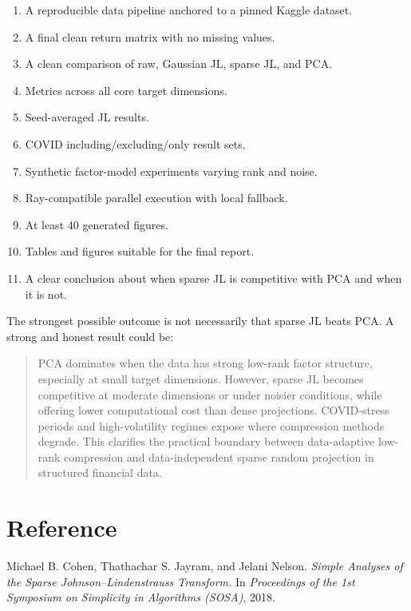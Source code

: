 \documentclass[11pt]{article}
\begin{document}
\begin{enumerate}
    \item A reproducible data pipeline anchored to a pinned Kaggle dataset.
    \item A final clean return matrix with no missing values.
    \item A clean comparison of raw, Gaussian JL, sparse JL, and PCA.
    \item Metrics across all core target dimensions.
    \item Seed-averaged JL results.
    \item COVID including/excluding/only result sets.
    \item Synthetic factor-model experiments varying rank and noise.
    \item Ray-compatible parallel execution with local fallback.
    \item At least 40 generated figures.
    \item Tables and figures suitable for the final report.
    \item A clear conclusion about when sparse JL is competitive with PCA and when it is not.
\end{enumerate}

The strongest possible outcome is not necessarily that sparse JL beats PCA. A strong and honest result could be:

\begin{quote}
PCA dominates when the data has strong low-rank factor structure, especially at small target dimensions. However, sparse JL becomes competitive at moderate dimensions or under noisier conditions, while offering lower computational cost than dense projections. COVID-stress periods and high-volatility regimes expose where compression methods degrade. This clarifies the practical boundary between data-adaptive low-rank compression and data-independent sparse random projection in structured financial data.
\end{quote}

\section{Reference}

Michael B. Cohen, Thathachar S. Jayram, and Jelani Nelson.
\emph{Simple Analyses of the Sparse Johnson--Lindenstrauss Transform.}
In \emph{Proceedings of the 1st Symposium on Simplicity in Algorithms (SOSA)}, 2018.
\end{document}

